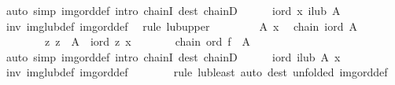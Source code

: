 \begin{isabellebody}
\ {\isacharparenleft}{\kern0pt}auto\ simp{\isacharcolon}{\kern0pt}\ img{\isacharunderscore}{\kern0pt}ord{\isacharunderscore}{\kern0pt}def\ intro{\isacharcolon}{\kern0pt}\ chainI\ dest{\isacharcolon}{\kern0pt}\ chainD{\isacharparenright}{\kern0pt}\isanewline
\ \ \ \ \isamarkupfalse%
\ {\isachardoublequoteopen}{\isacharquery}{\kern0pt}iord\ x\ {\isacharparenleft}{\kern0pt}{\isacharquery}{\kern0pt}ilub\ A{\isacharparenright}{\kern0pt}{\isachardoublequoteclose}\isanewline
\ \ \ \ \ \ \isamarkupfalse%
\ inv\ img{\isacharunderscore}{\kern0pt}lub{\isacharunderscore}{\kern0pt}def\ img{\isacharunderscore}{\kern0pt}ord{\isacharunderscore}{\kern0pt}def\ \isamarkupfalse%
\ {\isacharparenleft}{\kern0pt}rule\ lub{\isacharunderscore}{\kern0pt}upper{\isacharparenright}{\kern0pt}\isanewline
\ \ \isamarkupfalse%
\isanewline
\ \ \ \ \isamarkupfalse%
\ A\ x\ \isamarkupfalse%
\ {\isachardoublequoteopen}chain\ {\isacharquery}{\kern0pt}iord\ A{\isachardoublequoteclose}\isanewline
\ \ \ \ \ \ \ {}{\isacharcolon}{\kern0pt}\ {\isachardoublequoteopen}{\isasymAnd}z{\isachardot}{\kern0pt}\ z\ {\isasymin}\ A\ {\isasymLongrightarrow}\ {\isacharquery}{\kern0pt}iord\ z\ x{\isachardoublequoteclose}\isanewline
\ \ \ \ \isamarkupfalse%
\ \isamarkupfalse%
\ {\isachardoublequoteopen}chain\ ord\ {\isacharparenleft}{\kern0pt}f\ {\isacharbackquote}{\kern0pt}\ A{\isacharparenright}{\kern0pt}{\isachardoublequoteclose}\isanewline
\ \ \ \ \ \ \isamarkupfalse%
\ {\isacharparenleft}{\kern0pt}auto\ simp{\isacharcolon}{\kern0pt}\ img{\isacharunderscore}{\kern0pt}ord{\isacharunderscore}{\kern0pt}def\ intro{\isacharcolon}{\kern0pt}\ chainI\ dest{\isacharcolon}{\kern0pt}\ chainD{\isacharparenright}{\kern0pt}\isanewline
\ \ \ \ \isamarkupfalse%
\ {\isachardoublequoteopen}{\isacharquery}{\kern0pt}iord\ {\isacharparenleft}{\kern0pt}{\isacharquery}{\kern0pt}ilub\ A{\isacharparenright}{\kern0pt}\ x{\isachardoublequoteclose}\isanewline
\ \ \ \ \ \ \isamarkupfalse%
\ inv\ img{\isacharunderscore}{\kern0pt}lub{\isacharunderscore}{\kern0pt}def\ img{\isacharunderscore}{\kern0pt}ord{\isacharunderscore}{\kern0pt}def\isanewline
\ \ \ \ \ \ \isamarkupfalse%
\ {\isacharparenleft}{\kern0pt}rule\ lub{\isacharunderscore}{\kern0pt}least{\isacharparenright}{\kern0pt}\ {\isacharparenleft}{\kern0pt}auto\ dest{\isacharcolon}{\kern0pt}\ {}{\isacharbrackleft}{\kern0pt}unfolded\ img{\isacharunderscore}{\kern0pt}ord{\isacharunderscore}{\kern0pt}def{\isacharbrackright}{\kern0pt}{\isacharparenright}{\kern0pt}\isanewline

\end{isabellebody}
